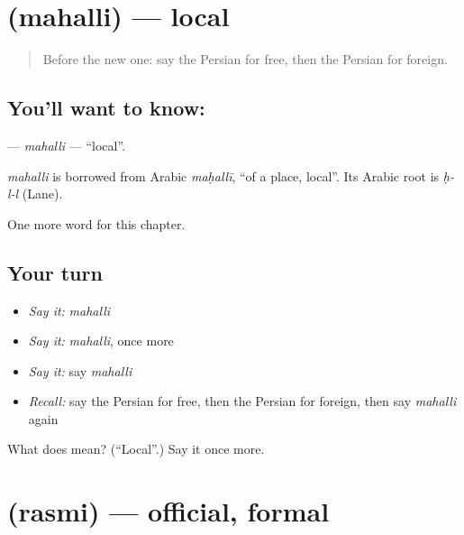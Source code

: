 \section[\texorpdfstring{\fa{محلی} (mahalli)}{محلی (mahalli)}]{ (mahalli) — local}

\label{lesson:FA-C271-mahalli}



\begin{quote}
Before the new one: say the Persian for free, then the Persian for foreign.
\end{quote}

\subsection*{You'll want to know: }
\textbf{} — \emph{mahalli} — \textquotedblleft{}local\textquotedblright{}.

\begin{cousinweb}
\emph{mahalli} is borrowed from Arabic \emph{maḥallī}, \textquotedblleft{}of a place, local\textquotedblright{}. Its Arabic root is \emph{ḥ-l-l} (Lane).
\end{cousinweb}

\begin{grammarlens}[title={What you've built}]
One more word for this chapter.
\end{grammarlens}

\subsection*{Your turn}
\begin{itemize}
\raggedright
  \item \emph{Say it:} \emph{mahalli}
  \item \emph{Say it:} \emph{mahalli}, once more
  \item \emph{Say it:} say \emph{mahalli}
  \item \emph{Recall:} say the Persian for free, then the Persian for foreign, then say \emph{mahalli} again
\end{itemize}

\begin{tcolorbox}[breakable,colback=teal!4,colframe=teal!35!black,title={Before you move on}]
What does  mean? (\textquotedblleft{}Local\textquotedblright{}.) Say it once more.
\end{tcolorbox}
\section[\texorpdfstring{\fa{رسمی} (rasmi)}{رسمی (rasmi)}]{ (rasmi) — official, formal}


